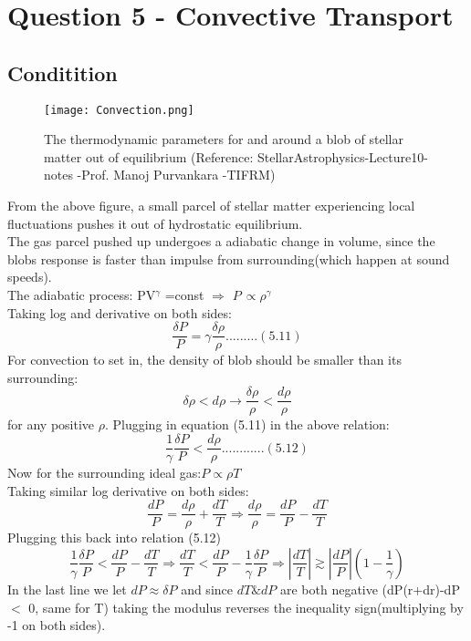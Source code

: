 \documentclass[11pt]{article}
\begin{document}
	\section{\color{teal} Question 5 - Convective Transport}
	
	\subsection{Conditition}
	\begin{figure}[h]
		\centering\texttt{[image: Convection.png]}
		\caption{The thermodynamic parameters for and around a blob of stellar matter out of equilibrium (Reference: StellarAstrophysics-Lecture10-notes -Prof. Manoj Purvankara -TIFRM)} 
		\label{fig:figure1}
	\end{figure}
	
	From the above figure, a small parcel of stellar matter experiencing local fluctuations pushes it out of hydrostatic equilibrium.\\
	The gas parcel pushed up undergoes a adiabatic change in volume, since the blobs response is faster than impulse from surrounding(which happen at sound speeds).\\ 
	
	The adiabatic process: PV$^\gamma$ =const $\Rightarrow$ $P \, \propto \rho^\gamma$\\
	
	Taking log and derivative on both sides:
	\[
		\frac{\delta P}{P} = \gamma \frac{\delta\rho}{\rho}.........(5.11)
	\]
	For convection to set in, the density of blob should be smaller than its surrounding:
	\[
		 \delta\rho < d\rho \rightarrow \frac{\delta\rho}{\rho}<\frac{d\rho}{\rho} 
	\]
	for any positive $\rho$.
	Plugging in equation (5.11) in the above relation:
	\[
		\frac{1}{\gamma}\frac{\delta P}{P} < \frac{d\rho}{\rho}............(5.12)
	\]
	Now for the surrounding ideal gas:\(P \propto \rho T\)\\
	Taking similar log derivative on both sides:
	\[
		\frac{dP}{P} = \frac{d\rho}{\rho}+\frac{dT}{T} \Rightarrow \frac{d\rho}{\rho} = \frac{dP}{P} - \frac{dT}{T}
	\]
	Plugging this back into relation (5.12)
	\[
		\frac{1}{\gamma}\frac{\delta P}{P}<\frac{dP}{P} - \frac{dT}{T} \Rightarrow \frac{dT}{T}<\frac{dP}{P}-\frac{1}{\gamma}\frac{\delta P}{P} \Rightarrow \boxed{|\frac{dT}{T}| \gtrsim |\frac{dP}{P}|(1-\frac{1}{\gamma})}
	\]
	In the last line we let \(dP\approx\delta P\) and since \(dT \& dP\) are both negative (dP(r+dr)-dP $<$ 0, same for T) taking the modulus reverses the inequality sign(multiplying by -1 on both sides).\\
	
\end{document}
